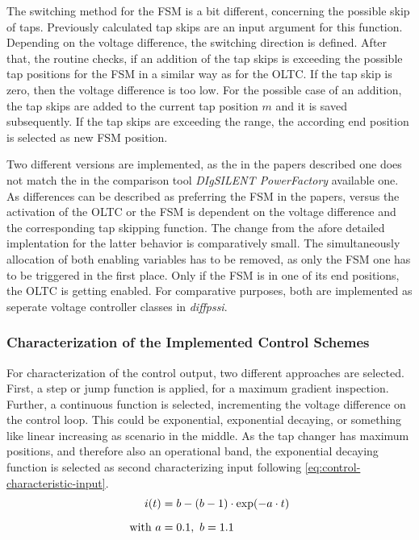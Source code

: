 The switching method for the \acs{FSM} is a bit different, concerning the possible skip of taps.
Previously calculated tap skips are an input argument for this function.
Depending on the voltage difference, the switching direction is defined.
After that, the routine checks, if an addition of the tap skips is exceeding the possible tap positions for the \acs{FSM} in a similar way as for the \acs{OLTC}.
If the tap skip is zero, then the voltage difference is too low.
For the possible case of an addition, the tap skips are added to the current tap position $m$ and it is saved subsequently.
If the tap skips are exceeding the range, the according end position is selected as new \acs{FSM} position. 

Two different versions are implemented, as the in the papers described one \autocite{burlakin_2024,burlakin_2024a} does not match the in the comparison tool \textit{DIgSILENT PowerFactory} available one.
As differences can be described as preferring the \acs{FSM} in the papers, versus the activation of the \acs{OLTC} or the \acs{FSM} is dependent on the voltage difference and the corresponding tap skipping function.
The change from the afore detailed implentation for the latter behavior is comparatively small.
The simultaneously allocation of both enabling variables has to be removed, as only the \acs{FSM} one has to be triggered in the first place.
Only if the \acs{FSM} is in one of its end positions, the \acs{OLTC} is getting enabled.
For comparative purposes, both are implemented as seperate voltage controller classes in \textit{diffpssi}.

\subsubsection{Characterization of the Implemented Control Schemes}

For characterization of the control output, two different approaches are selected.
First, a step or jump function is applied, for a maximum gradient inspection.
Further, a continuous function is selected, incrementing the voltage difference on the control loop.
This could be exponential, exponential decaying, or something like linear increasing as scenario in the middle.
As the tap changer has maximum positions, and therefore also an operational band, the exponential decaying function is selected as second characterizing input following \autoref{eq:control-characteristic-input}.
\begin{align}
        i(t) &=b - (b-1) \cdot \exp(-a \cdot t) \label{eq:control-characteristic-input} \\[6pt]
        \text{with } a&=0.1,~b=1.1 \notag
\end{align}

